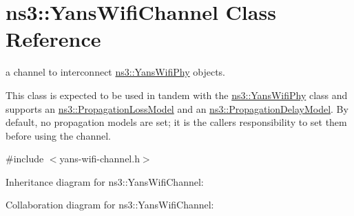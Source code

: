 \hypertarget{classns3_1_1YansWifiChannel}{}\section{ns3\+:\+:Yans\+Wifi\+Channel Class Reference}
\label{classns3_1_1YansWifiChannel}


a channel to interconnect \hyperlink{classns3_1_1YansWifiPhy}{ns3\+::\+Yans\+Wifi\+Phy} objects.

This class is expected to be used in tandem with the \hyperlink{classns3_1_1YansWifiPhy}{ns3\+::\+Yans\+Wifi\+Phy} class and supports an \hyperlink{classns3_1_1PropagationLossModel}{ns3\+::\+Propagation\+Loss\+Model} and an \hyperlink{classns3_1_1PropagationDelayModel}{ns3\+::\+Propagation\+Delay\+Model}. By default, no propagation models are set; it is the caller\textquotesingle{}s responsibility to set them before using the channel.  




{\ttfamily \#include $<$yans-\/wifi-\/channel.\+h$>$}



Inheritance diagram for ns3\+:\+:Yans\+Wifi\+Channel\+:


Collaboration diagram for ns3\+:\+:Yans\+Wifi\+Channel\+:
